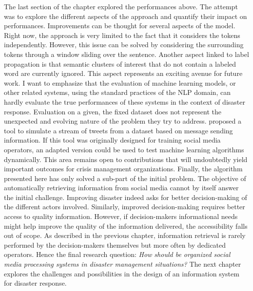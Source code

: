 The last section of the chapter explored the performances above.
The attempt was to explore the different aspects of the approach and quantify their impact on performances.
Improvements can be thought for several aspects of the model.
Right now, the approach is very limited to the fact that it considers the tokens independently.
However, this issue can be solved by considering the surrounding tokens through a window sliding over the sentence.
Another aspect linked to label propagation is that semantic clusters of interest that do not contain a labeled word are currently ignored.
This aspect represents an exciting avenue for future work.
I want to emphasize that the evaluation of machine learning models, or other related systems, using the standard practices of the NLP domain, can hardly evaluate the true performances of these systems in the context of disaster response.
Evaluation on a given, the fixed dataset does not represent the unexpected and evolving nature of the problem they try to address.
\textcite{halseSimulatingRealtimeTwitter2019} proposed a tool to simulate a stream of tweets from a dataset based on message sending information.
If this tool was originally designed for training social media operators, an adapted version could be used to test machine learning algorithms dynamically.
This area remains open to contributions that will undoubtedly yield important outcomes for crisis management organizations.
Finally, the algorithm presented here has only solved a sub-part of the initial problem.
The objective of automatically retrieving information from social media cannot by itself answer the initial challenge.
Improving disaster indeed asks for better decision-making of the different actors involved.
Similarly, improved decision-making requires better access to quality information.
However, if decision-makers informational needs might help improve the quality of the information delivered, the accessibility falls out of scope.
As described in the previous chapter, information retrieval is rarely performed by the decision-makers themselves but more often by dedicated operators.
Hence the final research question: \textit{How should be organized social media processing systems in disaster management situations?}
The next chapter explores the challenges and possibilities in the design of an information system for disaster response.

